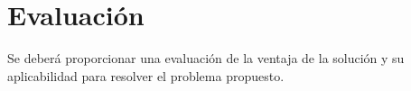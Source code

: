 \chapter{Evaluación}

Se deberá proporcionar una evaluación de la ventaja de la solución y su aplicabilidad para resolver el problema propuesto.